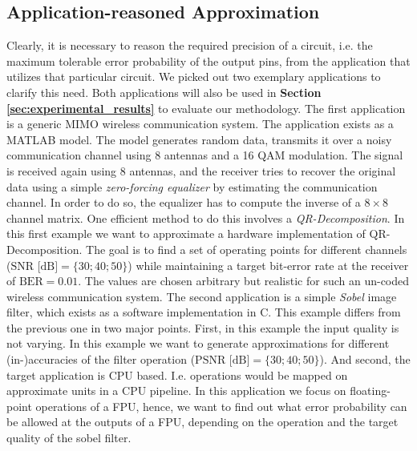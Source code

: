 \documentclass[10pt,twocolumn]{IEEEtran} %
\begin{document}
\subsection{\bf{Application-reasoned Approximation}}
\label{subsec:application_reasoned}
Clearly, it is necessary to reason the required precision of a circuit, i.e. the maximum tolerable error probability of the output pins, from the application that utilizes that particular circuit. We picked out two exemplary applications to clarify this need. Both applications will also be used in {\bf Section \ref{sec:experimental_results}} to evaluate our methodology. The first application is a generic MIMO wireless communication system. The application exists as a MATLAB model. The model generates random data, transmits it over a noisy communication channel using 8 antennas and a 16 QAM modulation. The signal is received again using 8 antennas, and the receiver tries to recover the original data using a simple \emph{zero-forcing equalizer} by estimating the communication channel. In order to do so, the equalizer has to compute the inverse of a $8\times8$ channel matrix. One efficient method to do this involves a \emph{QR-Decomposition}. In this first example we want to approximate a hardware implementation of QR-Decomposition. The goal is to find a set of operating points for different channels (\mbox{$\textrm{SNR [dB]} = \{30; 40; 50\}$}) while maintaining a target bit-error rate at the receiver of \mbox{$\textrm{BER}=0.01$}. The values are chosen arbitrary but realistic for such an un-coded wireless communication system. The second application is a simple \emph{Sobel} image filter, which exists as a software implementation in C. This example differs from the previous one in two major points. First, in this example the input quality is not varying. In this example we want to generate approximations for different (in-)accuracies of the filter operation (\mbox{$\textrm{PSNR [dB]} = \{30; 40; 50\}$}). And second, the target application is CPU based. I.e. operations would be mapped on approximate units in a CPU pipeline. In this application we focus on floating-point operations of a FPU, hence, we want to find out what error probability can be allowed at the outputs of a FPU, depending on the operation and the target quality of the sobel filter.
\end{document}
